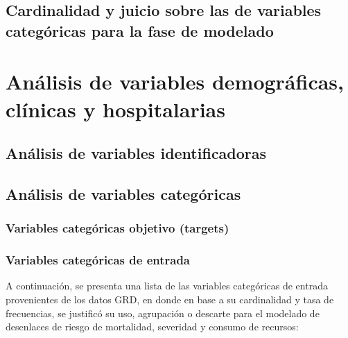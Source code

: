 \subsection{Cardinalidad y juicio sobre las de variables categóricas para la fase de modelado}


\section{Análisis de variables demográficas, clínicas y hospitalarias}

\subsection{Análisis de variables identificadoras}


\subsection{Análisis de variables categóricas}


\subsubsection{Variables categóricas objetivo (targets)}


\subsubsection{Variables categóricas de entrada}

A continuación, se presenta una lista de las variables categóricas de entrada provenientes de los datos GRD, en donde en base a su cardinalidad y tasa de frecuencias, se justificó su uso, agrupación o descarte para el modelado de desenlaces de riesgo de mortalidad, severidad y consumo de recursos:

